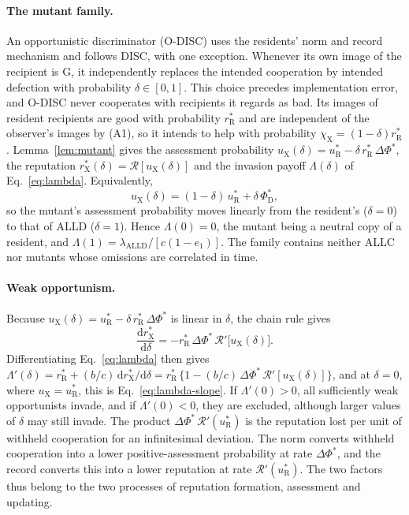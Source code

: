 \documentclass[10pt]{wlscirep}
\newcommand{\Rmap}{\mathscr{R}}            %
\newcommand{\rR}{r_{\mathrm{R}}^{*}}
\newcommand{\uR}{u_{\mathrm{R}}^{*}}
\newcommand{\rX}{r_{\mathrm{X}}^{*}}
\newcommand{\uX}{u_{\mathrm{X}}}
\newcommand{\PhiDs}{\Phi^{*}_{\mathrm{D}}}
\newcommand{\dPhi}{\Delta\Phi^{*}}
\newcommand{\dd}{\mathrm{d}}
\newcommand{\ALLD}{\mathrm{ALLD}}
\theoremstyle{plain}
\theoremstyle{remark}
\begin{document}
\paragraph{The mutant family.} An opportunistic discriminator (O-DISC) uses the residents' norm and record mechanism and follows DISC, with one exception. Whenever its own image of the recipient is G, it independently replaces the intended cooperation by intended defection with probability $\delta\in[0,1]$. This choice precedes implementation error, and O-DISC never cooperates with recipients it regards as bad. Its images of resident recipients are good with probability $\rR$ and are independent of the observer's images by (A1), so it intends to help with probability $\chi_{\mathrm X}=(1-\delta)\rR$. Lemma~\ref{lem:mutant} gives the assessment probability $\uX(\delta)=\uR-\delta\,\rR\,\dPhi$, the reputation $\rX(\delta)=\Rmap[\uX(\delta)]$ and the invasion payoff $\Lambda(\delta)$ of Eq.~\eqref{eq:lambda}. Equivalently,
\begin{equation}
\uX(\delta)=(1-\delta)\,\uR+\delta\,\PhiDs,
\label{eq:s-odisc-u}
\end{equation}
so the mutant's assessment probability moves linearly from the resident's ($\delta=0$) to that of ALLD ($\delta=1$). Hence $\Lambda(0)=0$, the mutant being a neutral copy of a resident, and $\Lambda(1)=\lambda_{\ALLD}/[c(1-e_1)]$. The family contains neither ALLC nor mutants whose omissions are correlated in time.

\paragraph{Weak opportunism.} Because $\uX(\delta)=\uR-\delta\,\rR\,\dPhi$ is linear in $\delta$, the chain rule gives
\begin{equation}
\frac{\dd\rX}{\dd\delta}=-\rR\,\dPhi\,\Rmap'\bigl[\uX(\delta)\bigr].
\label{eq:s-drX}
\end{equation}
Differentiating Eq.~\eqref{eq:lambda} then gives $\Lambda'(\delta)=\rR+(b/c)\,\dd\rX/\dd\delta=\rR\,\{1-(b/c)\,\dPhi\,\Rmap'[\uX(\delta)]\}$, and at $\delta=0$, where $\uX=\uR$, this is Eq.~\eqref{eq:lambda-slope}. If $\Lambda'(0)>0$, all sufficiently weak opportunists invade, and if $\Lambda'(0)<0$, they are excluded, although larger values of $\delta$ may still invade. The product $\dPhi\,\Rmap'(\uR)$ is the reputation lost per unit of withheld cooperation for an infinitesimal deviation. The norm converts withheld cooperation into a lower positive-assessment probability at rate $\dPhi$, and the record converts this into a lower reputation at rate $\Rmap'(\uR)$. The two factors thus belong to the two processes of reputation formation, assessment and updating.
\end{document}
